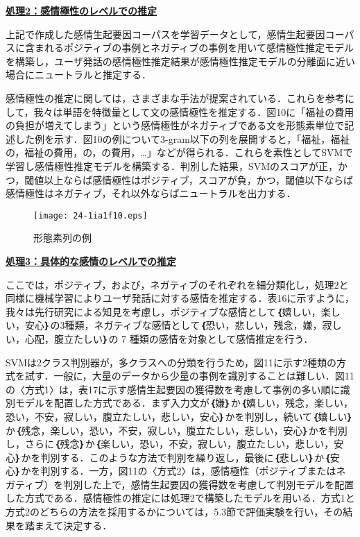 \documentclass[japanese]{jnlp_1.4}
\begin{document}
\noindent\textbf{\underline{処理2：感情極性のレベルでの推定}}

上記で作成した感情生起要因コーパスを学習データとして，感情生起要因コーパスに含まれるポジティブの事例とネガティブの事例を用いて感情極性推定モデルを構築し，ユーザ発話の感情極性推定結果が感情極性推定モデルの分離面に近い場合にニュートラルと推定する．

感情極性の推定に関しては，さまざまな手法が提案されている\cite{no53,no33,no54}．これらを参考にして，我々は単語を特徴量として文の感情極性を推定する．図10に「福祉の費用の負担が増えてしまう」という感情極性がネガティブである文を形態素単位で記述した例を示す．図10の例について3-gram以下の列を展開すると，「福祉，福祉の，福祉の費用，の，の費用，…」などが得られる．これらを素性としてSVMで学習し感情極性推定モデルを構築する．判別した結果，SVMのスコアが正，かつ，閾値以上ならば感情極性はポジティブ，スコアが負，かつ，閾値以下ならば感情極性はネガティブ，それ以外ならばニュートラルを出力する．

\begin{figure}[b]
\begin{center}
\texttt{[image: 24-1ia1f10.eps]}
\end{center}
\caption{形態素列の例}
\label{fig:10}
\end{figure}


\noindent\textbf{\underline{処理3：具体的な感情のレベルでの推定}}

ここでは，ポジティブ，および，ネガティブのそれぞれを細分類化し，処理2と同様に機械学習によりユーザ発話に対する感情を推定する．表16に示すように，我々は先行研究\cite{no55,no56}による知見を考慮し，ポジティブな感情として\textbf{｛}嬉しい，楽しい，安心\textbf{｝}の3種類，ネガティブな感情として\textbf{｛}恐い，悲しい，残念，嫌，寂しい，心配，腹立たしい\textbf{｝}の 7 種類の感情を対象として感情推定を行う． 

SVMは2クラス判別器が，多クラスへの分類を行うため，図11に示す2種類の方式を試す．一般に，大量のデータから少量の事例を識別することは難しい．図11の〈方式1〉は，表17に示す感情生起要因の獲得数を考慮して事例の多い順に識別モデルを配置した方式である．まず入力文が\textbf{｛}嫌\textbf{｝}か\textbf{｛}嬉しい，残念，楽しい，恐い，不安，寂しい，腹立たしい，悲しい，安心\textbf{｝}かを判別し，続いて\textbf{｛}嬉しい\textbf{｝}か\textbf{｛}残念，楽しい，恐い，不安，寂しい，腹立たしい，悲しい，安心\textbf{｝}かを判別し，さらに\textbf{｛}残念\textbf{｝}か\textbf{｛}楽しい，恐い，不安，寂しい，腹立たしい，悲しい，安心\textbf{｝}かを判別する．このような方法で判別を繰り返し，最後に\textbf{｛}悲しい\textbf{｝}か\textbf{｛}安心\textbf{｝}かを判別する．一方，図11の〈方式2〉は，感情極性（ポジティブまたはネガティブ）を判別した上で，感情生起要因の獲得数を考慮して判別モデルを配置した方式である．感情極性の推定には処理2で構築したモデルを用いる．方式1と方式2のどちらの方法を採用するかについては，5.3節で評価実験を行い，その結果を踏まえて決定する．
\end{document}
